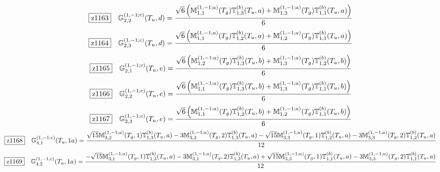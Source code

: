 \documentclass[fleqn,10pt,landscape]{jsarticle}
\begin{document}
\begin{dmath*}
\hspace*{3mm}\fbox{z1163}\quad \mathbb{G}_{2,2}^{(1,-1;c)}(T_{u},d)=\frac{\sqrt{6} \left(\mathbb{M}_{1,1}^{(1,-1;a)}(T_{g}) \mathbb{T}_{1,3}^{(b)}(T_{u},a) + \mathbb{M}_{1,3}^{(1,-1;a)}(T_{g}) \mathbb{T}_{1,1}^{(b)}(T_{u},a)\right)}{6}
\end{dmath*}
\begin{dmath*}
\hspace*{3mm}\fbox{z1164}\quad \mathbb{G}_{2,3}^{(1,-1;c)}(T_{u},d)=\frac{\sqrt{6} \left(\mathbb{M}_{1,1}^{(1,-1;a)}(T_{g}) \mathbb{T}_{1,2}^{(b)}(T_{u},a) + \mathbb{M}_{1,2}^{(1,-1;a)}(T_{g}) \mathbb{T}_{1,1}^{(b)}(T_{u},a)\right)}{6}
\end{dmath*}
\begin{dmath*}
\hspace*{3mm}\fbox{z1165}\quad \mathbb{G}_{2,1}^{(1,-1;c)}(T_{u},e)=\frac{\sqrt{6} \left(\mathbb{M}_{1,2}^{(1,-1;a)}(T_{g}) \mathbb{T}_{1,3}^{(b)}(T_{u},b) + \mathbb{M}_{1,3}^{(1,-1;a)}(T_{g}) \mathbb{T}_{1,2}^{(b)}(T_{u},b)\right)}{6}
\end{dmath*}
\begin{dmath*}
\hspace*{3mm}\fbox{z1166}\quad \mathbb{G}_{2,2}^{(1,-1;c)}(T_{u},e)=\frac{\sqrt{6} \left(\mathbb{M}_{1,1}^{(1,-1;a)}(T_{g}) \mathbb{T}_{1,3}^{(b)}(T_{u},b) + \mathbb{M}_{1,3}^{(1,-1;a)}(T_{g}) \mathbb{T}_{1,1}^{(b)}(T_{u},b)\right)}{6}
\end{dmath*}
\begin{dmath*}
\hspace*{3mm}\fbox{z1167}\quad \mathbb{G}_{2,3}^{(1,-1;c)}(T_{u},e)=\frac{\sqrt{6} \left(\mathbb{M}_{1,1}^{(1,-1;a)}(T_{g}) \mathbb{T}_{1,2}^{(b)}(T_{u},b) + \mathbb{M}_{1,2}^{(1,-1;a)}(T_{g}) \mathbb{T}_{1,1}^{(b)}(T_{u},b)\right)}{6}
\end{dmath*}
\begin{dmath*}
\hspace*{3mm}\fbox{z1168}\quad \mathbb{G}_{4,1}^{(1,-1;c)}(T_{u},1a)=\frac{\sqrt{15} \mathbb{M}_{3,2}^{(1,-1;a)}(T_{g},1) \mathbb{T}_{1,3}^{(b)}(T_{u},a) - 3 \mathbb{M}_{3,2}^{(1,-1;a)}(T_{g},2) \mathbb{T}_{1,3}^{(b)}(T_{u},a) - \sqrt{15} \mathbb{M}_{3,3}^{(1,-1;a)}(T_{g},1) \mathbb{T}_{1,2}^{(b)}(T_{u},a) - 3 \mathbb{M}_{3,3}^{(1,-1;a)}(T_{g},2) \mathbb{T}_{1,2}^{(b)}(T_{u},a)}{12}
\end{dmath*}
\begin{dmath*}
\hspace*{3mm}\fbox{z1169}\quad \mathbb{G}_{4,2}^{(1,-1;c)}(T_{u},1a)=\frac{- \sqrt{15} \mathbb{M}_{3,1}^{(1,-1;a)}(T_{g},1) \mathbb{T}_{1,3}^{(b)}(T_{u},a) - 3 \mathbb{M}_{3,1}^{(1,-1;a)}(T_{g},2) \mathbb{T}_{1,3}^{(b)}(T_{u},a) + \sqrt{15} \mathbb{M}_{3,3}^{(1,-1;a)}(T_{g},1) \mathbb{T}_{1,1}^{(b)}(T_{u},a) - 3 \mathbb{M}_{3,3}^{(1,-1;a)}(T_{g},2) \mathbb{T}_{1,1}^{(b)}(T_{u},a)}{12}
\end{dmath*}
\end{document}
